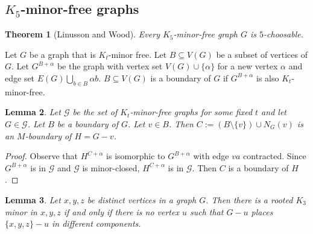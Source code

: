 \documentclass[]{article}
\newtheorem{theorem}{Theorem}
\newtheorem{lemma}[theorem]{Lemma}
\theoremstyle{definition}
\numberwithin{theorem}{section}
\numberwithin{equation}{section}
\begin{document}
\subsection{$K_5$-minor-free graphs}
\begin{theorem}[Linusson and Wood]
	Every $K_5$-minor-free graph $G$ is $5$-choosable.
\end{theorem}

Let $G$ be a graph that is $K_t$-minor free. 
Let $B \subseteq V(G)$ be a subset of vertices of $G$. Let $G^{B + \alpha}$ be the graph with vertex set $V(G) \cup \{\alpha\}$ for a new vertex $\alpha$ and edge set $E(G) \bigcup_{b \in B} \alpha b$. $B \subseteq V(G)$ is a boundary of $G$ if $G^{B + \alpha}$ is also $K_t$-minor-free. 

\begin{lemma}
	Let $\mathcal{G}$ be the set of $K_t$-minor-free graphs for some fixed $t$ and let $G \in \mathcal{G}$. Let $B$ be a boundary of $G$. Let $v \in B$. Then $C := (B \setminus \{v\}) \cup N_G(v)$ is an $M$-boundary of $H = G - v$. 
\end{lemma}

\begin{proof}
	Observe that $H^{C + \alpha}$ is isomorphic to $G^{B + \alpha}$ with edge $va$ contracted. Since $G^{B + \alpha}$ is in $\mathcal{G}$ and $\mathcal{G}$ is minor-closed, $H^{C + \alpha}$ is in $\mathcal{G}$. Then $C$ is a boundary of $H$. 
\end{proof}

\begin{lemma}
	Let $x, y, z$ be distinct vertices in a graph $G$. Then there is a rooted $K_3$ minor in $x, y, z$ if and only if there is no vertex $u$ such that $G - u$ places $\{x, y, z\} - u$ in different components.
\end{lemma}
\end{document}
